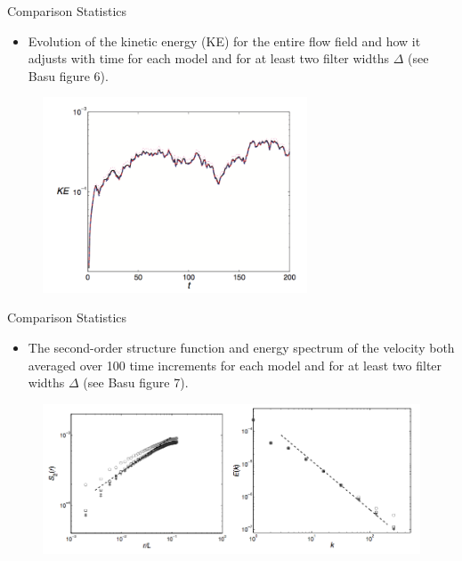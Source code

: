 \begin{frame}{Comparison Statistics}
    \begin{itemize}
	\item Evolution of the kinetic energy (KE) for the entire flow field and how it adjusts with time for each model and for at least two filter widths $\Delta$ (see Basu figure 6).
	\end{itemize}
     \begin{figure}
      \includegraphics[width=0.7\textwidth]{basu6}
    \end{figure}
\end{frame}

\begin{frame}{Comparison Statistics}
    \begin{itemize}
	\item The second-order structure function and energy spectrum of the velocity both averaged over 100 time increments for each model and for at least two filter widths $\Delta$ (see Basu figure 7).
	\end{itemize}
     \begin{figure}
      \includegraphics[width=1\textwidth]{basu7}
    \end{figure}
\end{frame}

